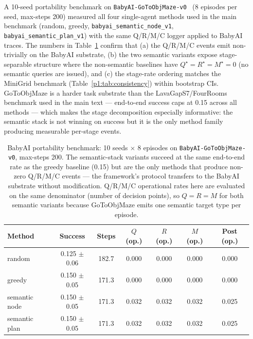 \documentclass{article}
\begin{document}
A 10-seed portability benchmark on \texttt{BabyAI-GoToObjMaze-v0}~\citep{chevalier2018babyai} (8 episodes per seed, max-steps 200) measured all four single-agent methods used in the main benchmark (random, greedy, \texttt{babyai\_semantic\_node\_v1}, \texttt{babyai\_semantic\_plan\_v1}) with the same Q/R/M/C logger applied to BabyAI traces. The numbers in Table~\ref{p1:tab:babyai-deeper} confirm that (a) the Q/R/M/C events emit non-trivially on the BabyAI substrate, (b) the two semantic variants expose stage-separable structure where the non-semantic baselines have $Q^\star{=}R^\star{=}M^\star{=}0$ (no semantic queries are issued), and (c) the stage-rate ordering matches the MiniGrid benchmark (Table~\ref{p1:tab:consistency}) within bootstrap CIs. GoToObjMaze is a harder task substrate than the LavaGapS7/FourRooms benchmark used in the main text --- end-to-end success caps at 0.15 across all methods --- which makes the stage decomposition especially informative: the semantic stack is not winning on success but it is the only method family producing measurable per-stage events.

\begin{table}[h]
\centering
\caption{BabyAI portability benchmark: 10 seeds $\times$ 8 episodes on \texttt{BabyAI-GoToObjMaze-v0}, max-steps 200. The semantic-stack variants succeed at the same end-to-end rate as the greedy baseline (0.15) but are the only methods that produce non-zero Q/R/M/C events --- the framework's protocol transfers to the BabyAI substrate without modification. Q/R/M/C operational rates here are evaluated on the same denominator (number of decision points), so $Q{=}R{=}M$ for both semantic variants because GoToObjMaze emits one semantic target type per episode.}
\label{p1:tab:babyai-deeper}
\small
\begin{tabular}{l c c c c c c}
\toprule
Method & Success & Steps & $Q$ (op.) & $R$ (op.) & $M$ (op.) & Post (op.) \\
\midrule
random         & 0.125 $\pm$ 0.06 & 182.7 & 0.000 & 0.000 & 0.000 & 0.000 \\
greedy         & 0.150 $\pm$ 0.05 & 171.3 & 0.000 & 0.000 & 0.000 & 0.000 \\
semantic node  & 0.150 $\pm$ 0.05 & 171.3 & 0.032 & 0.032 & 0.032 & 0.025 \\
semantic plan  & 0.150 $\pm$ 0.05 & 171.3 & 0.032 & 0.032 & 0.032 & 0.025 \\
\bottomrule
\end{tabular}
\end{table}
\end{document}
